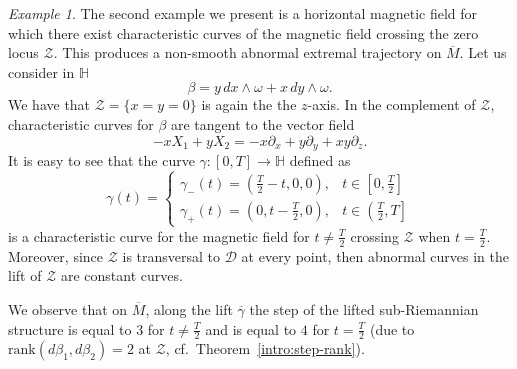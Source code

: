 \documentclass{amsart}
\theoremstyle{plain}
\theoremstyle{definition}
\theoremstyle{remark}
\newtheorem{example}[thm]{Example}
\newcommand{\R}{\mathbb{R}}
\newcommand{\p}{\partial}												%
\newcommand{\distr}{\mathcal{D}}								%
\newcommand{\B}{\beta}
\newcommand{\lift}[1]{\overline{#1}} 							%
\begin{document}
\begin{example}
\label{ex:crossing0}
The second example we present is a horizontal magnetic field for which there exist characteristic curves of the magnetic field crossing the zero locus $\mathcal{Z}$. This produces a non-smooth abnormal extremal trajectory on $\lift M$.
Let us consider in $\mathbb{H}$
\begin{equation}
\B=y\,dx\wedge\omega+x\,dy\wedge\omega.
\end{equation}
We have that $\mathcal{Z}=\{x=y=0\}$ is again the the $z$-axis. 
In the complement of $\mathcal{Z}$, characteristic curves for $\beta$ are tangent to the vector field
\begin{equation}
-xX_1+yX_2=-x\p_x+y\p_y+xy\partial_{z}.
\end{equation}
It is easy to see that the curve $\gamma:[0,T]\to \mathbb{H}$ defined as
\begin{equation}
\gamma (t) = \begin{cases}
\gamma_{-}(t)=(\frac T 2 - t, 0,0), & t\in\left[0,\frac{T}{2}\right]\\
\gamma_{+}(t)=(0,t- \frac T 2,0),  & t\in\left(\frac{T}{2}, T\right]
\end{cases}
\end{equation}
is a characteristic curve for the magnetic field for $t\neq \frac{T}{2}$ crossing $\mathcal{Z}$ when $t= \frac{T}{2}$.
Moreover, since $\mathcal{Z}$ is transversal to $\distr$ at every point, then abnormal curves in the lift of $\mathcal{Z}$ are constant curves.

We observe that on $\lift M$, along the lift $\lift \gamma$ the step of the lifted sub-Riemannian structure  is equal to $3$ for $t\neq \frac{T}{2}$ and is equal to $4$ for $t= \frac{T}{2}$ (due to $\mathrm{rank}(d\beta_{1},d\beta_{2})=2$ at $\mathcal{Z}$, cf.\ Theorem~\ref{intro:step-rank}).

\end{example}
\end{document}
